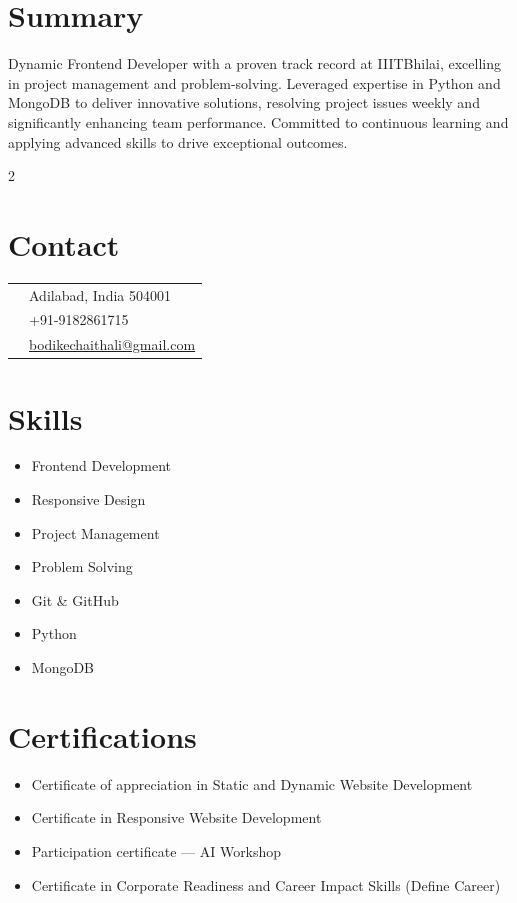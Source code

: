 \documentclass[a4paper,11pt]{article}
\begin{document}
	\section*{Summary}
	Dynamic Frontend Developer with a proven track record at IIITBhilai, excelling in project management and problem-solving. Leveraged expertise in Python and MongoDB to deliver innovative solutions, resolving project issues weekly and significantly enhancing team performance. Committed to continuous learning and applying advanced skills to drive exceptional outcomes.
	\vspace{6pt}
	\begin{paracol}{2}
		\setlength{\columnsep}{1cm}
		\switchcolumn
		\section*{Contact}
		\begin{tabular}{@{}rl@{}}
			\faMapMarker & Adilabad, India 504001 \\
			\faPhone & +91-9182861715 \\
			\faEnvelope & \href{mailto:bodikechaithali@gmail.com}{bodikechaithali@gmail.com} \\
		\end{tabular}
		\section*{Skills}
		\begin{itemize}
		\item Frontend Development
		\item Responsive Design
		\item Project Management
		\item Problem Solving
		\item Git \& GitHub
		\item Python
		\item MongoDB
		\end{itemize}
		\section*{Certifications}
		\begin{itemize}
			\item Certificate of appreciation in Static and Dynamic Website Development
			\item Certificate in Responsive Website Development
			\item Participation certificate — AI Workshop
			\item Certificate in Corporate Readiness and Career Impact Skills (Define Career)
		\end{itemize}
	

\end{paracol}
\end{document}
